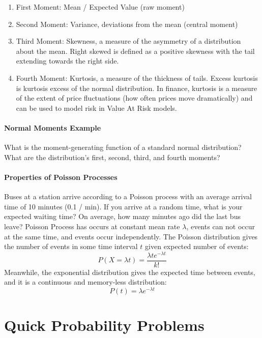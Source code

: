 \documentclass{article}
\begin{document}
\begin{enumerate}
    \item First Moment: Mean / Expected Value (raw moment)
    \item Second Moment: Variance, deviations from the mean (central moment)
    \item Third Moment: Skewness, a measure of the asymmetry of a distribution about the mean. Right skewed is defined as a positive skewness with the tail extending towards the right side. 
    \item Fourth Moment: Kurtosis, a measure of the thickness of tails. Excess kurtosis is kurtosis excess of the normal distribution. In finance, kurtosis is a measure of the extent of price fluctuations (how often prices move dramatically) and can be used to model risk in Value At Risk models.
\end{enumerate}

\paragraph{Normal Moments Example}
What is the moment-generating function of a standard normal distribution? What are the distribution's first, second, third, and fourth moments?
\newline
\newline
\paragraph{Properties of Poisson Processes}
Buses at a station arrive according to a Poisson process with an average arrival time of 10 minutes (0.1 / min). If you arrive at a random time, what is your expected waiting time? On average, how many minutes ago did the last bus leave?
\newline
\newline
Poisson Process has occurs at constant mean rate \(\lambda\), events can not occur at the same time, and events occur independently. The Poisson distribution gives the number of events in some time interval \(t\) given expected number of events: 
\[P(X = \lambda t) = \frac{\lambda t e^{-\lambda t}}{k!}\]
Meanwhile, the exponential distribution gives the expected time between events, and it is a continuous and memory-less distribution:
\[P(t) = \lambda e^{-\lambda t}\]

\section{Quick Probability Problems}
\end{document}
